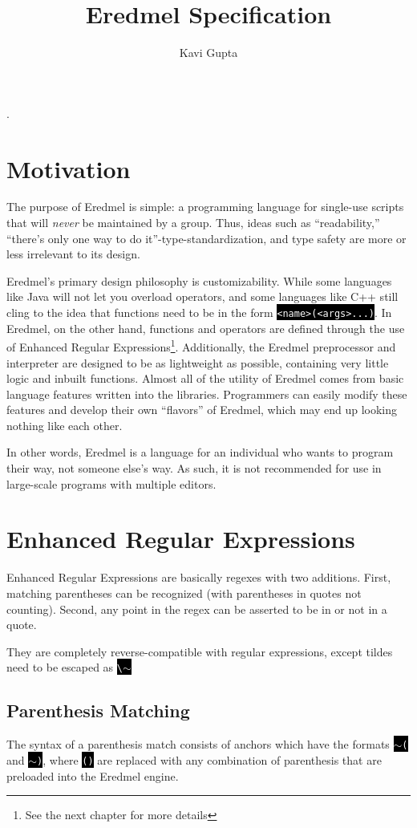 \documentclass{book}
\newcommand{\code}{\texttt}
\newcommand{\codebox}[1]{\leavevmode\colorbox{black}{\textcolor{white}{\code{#1}}}}
\newcommand{\bak}{\textbackslash}
\newcommand{\til}{$\sim$}
\begin{document}
\title{Eredmel Specification}.
\author{Kavi Gupta}
\maketitle

\chapter{Motivation}

The purpose of Eredmel is simple: a programming language for single-use scripts that will \emph{never} be maintained by a group. Thus, ideas such as ``readability,'' ``there's only one way to do it''-type-standardization, and type safety are more or less irrelevant to its design.

Eredmel's primary design philosophy is customizability. While some languages like Java will not let you overload operators, and some languages like C++ still cling to the idea that functions need to be in the form \codebox{<name>(<args>...)}. In Eredmel, on the other hand, functions and operators are defined through the use of Enhanced Regular Expressions\footnote{See the next chapter for more details}. Additionally, the Eredmel preprocessor and interpreter are designed to be as lightweight as possible, containing very little logic and inbuilt functions. Almost all of the utility of Eredmel comes from basic language features written into the libraries. Programmers can easily modify these features and develop their own ``flavors'' of Eredmel, which may end up looking nothing like each other.

In other words, Eredmel is a language for an individual who wants to program their way, not someone else's way. As such, it is not recommended for use in large-scale programs with multiple editors.

\chapter{Enhanced Regular Expressions}

Enhanced Regular Expressions are basically regexes with two additions. First, matching parentheses can be recognized (with parentheses in quotes not counting). Second, any point in the regex can be asserted to be in or not in a quote.

They are completely reverse-compatible with regular expressions, except tildes need to be escaped as \codebox{\bak\til}

\section{Parenthesis Matching}
The syntax of a parenthesis match consists of anchors which have the formats \codebox{\til(} and \codebox{\til)}, where \codebox{()} are replaced with any combination of parenthesis that are preloaded into the Eredmel engine. 
\end{document}
